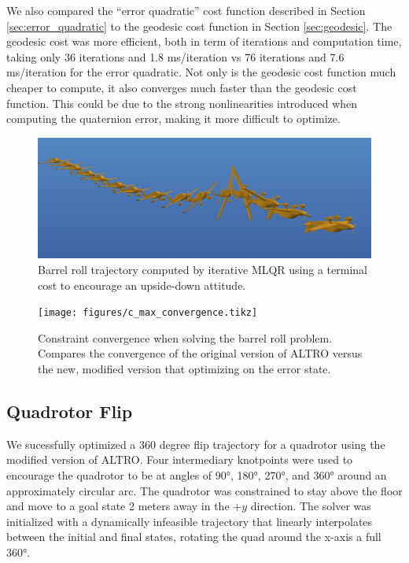 \documentclass[letterpaper, 10 pt, conference]{ieeeconf}  %
\begin{document}
        We also compared the ``error quadratic'' cost function described in Section
        \ref{sec:error_quadratic} to the geodesic cost function in Section
        \ref{sec:geodesic}. The geodesic cost was more efficient, both in term of
        iterations and computation time, taking only 36 iterations and 1.8 ms/iteration
        vs 76 iterations and 7.6 ms/iteration for the error quadratic. Not only is the
        geodesic cost function much cheaper to compute, it also converges much faster
        than the geodesic cost function. This could be due to the strong nonlinearities
        introduced when computing the quaternion error, making it more difficult to
        optimize.
        
        \begin{figure}[h]
            \centering
            \includegraphics[width=\columnwidth]{figures/barrellroll.png}
            \caption{Barrel roll trajectory computed by iterative MLQR using a terminal cost to encourage an upside-down attitude.}
            \label{fig:barrellroll}
        \end{figure}

        \begin{figure}[h]
            \centering
            \texttt{[image: figures/c\_max\_convergence.tikz]}
            \caption{Constraint convergence when solving the barrel roll problem. Compares 
            the convergence of the original version of ALTRO versus the new, modified version
            that optimizing on the error state.}
            \label{fig:c_max_convergence}
        \end{figure}

    \subsection{Quadrotor Flip}
        We sucessfully optimized a 360 degree flip trajectory for a quadrotor using the 
        modified version of ALTRO.
	    Four intermediary knotpoints were used to encourage the quadrotor to be at angles
        of \ang{90}, \ang{180}, \ang{270}, and \ang{360} around an approximately circular arc.
        The quadrotor was constrained
	    to stay above the floor and move to a goal state 2 meters away in the $+y$
	    direction. The solver was initialized with a dynamically infeasible trajectory
	    that linearly interpolates between the initial and final states, rotating the
        quad around the x-axis a full \ang{360}.
\end{document}
